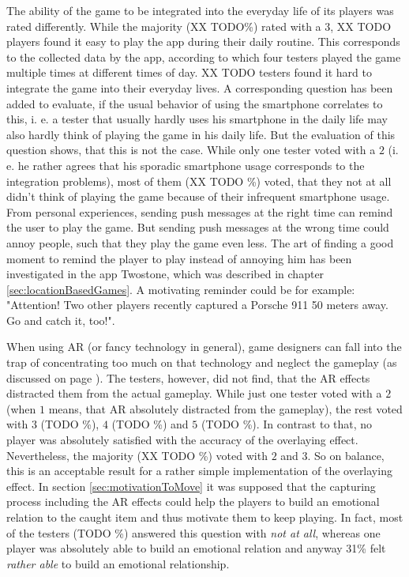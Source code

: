 The ability of the game to be integrated into the everyday life of its players was rated differently. While the majority (XX TODO\%) rated with a $3$, XX TODO players found it easy to play the app during their daily routine. This corresponds to the collected data by the app, according to which four testers played the game multiple times at different times of day. XX TODO testers found it hard to integrate the game into their everyday lives. A corresponding question has been added to evaluate, if the usual behavior of using the smartphone correlates to this, i. e. a tester that usually hardly uses his smartphone in the daily life may also hardly think of playing the game in his daily life. But the evaluation of this question shows, that this is not the case. While only one tester voted with a $2$ (i. e. he rather agrees that his sporadic smartphone usage corresponds to the integration problems), most of them (XX TODO \%) voted, that they not at all didn't think of playing the game because of their infrequent smartphone usage. From personal experiences, sending push messages at the right time can remind the user to play the game. But sending push messages at the wrong time could annoy people, such that they play the game even less. The art of finding a good moment to remind the player to play instead of annoying him has been investigated in the app Twostone, which was described in chapter \ref{sec:locationBasedGames}. A motivating reminder could be for example: "Attention! Two other players recently captured a Porsche 911 50 meters away. Go and catch it, too!".

When using AR (or fancy technology in general), game designers can fall into the trap of concentrating too much on that technology and neglect the gameplay (as discussed on page \pageref{sec:usageOfARStateOfTheArt}). The testers, however, did not find, that the AR effects distracted them from the actual gameplay. While just one tester voted with a $2$ (when $1$ means, that AR absolutely distracted from the gameplay), the rest voted with $3$ (TODO \%), $4$ (TODO \%) and $5$ (TODO \%). In contrast to that, no player was absolutely satisfied with the accuracy of the overlaying effect. Nevertheless, the majority (XX TODO \%) voted with $2$ and $3$. So on balance, this is an acceptable result for a rather simple implementation of the overlaying effect. In section \ref{sec:motivationToMove} it was supposed that the capturing process including the AR effects could help the players to build an emotional relation to the caught item and thus motivate them to keep playing. In fact, most of the testers (TODO \%) answered this question with \emph{not at all}, whereas one player was absolutely able to build an emotional relation and anyway 31\% felt \emph{rather able} to build an emotional relationship.

